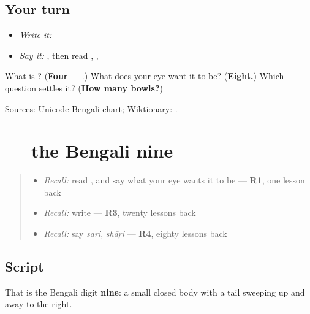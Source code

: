 \subsection*{Your turn}
\begin{itemize}
\raggedright
  \item \emph{Write it:} 
  \item \emph{Say it:} \textbf{}, then read \textbf{}, \textbf{}, \textbf{}
\end{itemize}

\begin{tcolorbox}[breakable,colback=teal!4,colframe=teal!35!black,title={Before you move on}]
What is \textbf{}? (\textbf{Four} — \textbf{}.) What does your eye want it to be? (\textbf{Eight.}) Which question settles it? (\textbf{How many bowls?})

Sources: \href{https://www.unicode.org/charts/PDF/U0980.pdf}{Unicode Bengali chart}; \href{https://en.wiktionary.org/wiki/\%E0\%A7\%AA}{Wiktionary: }.
\end{tcolorbox}
\section[\texorpdfstring{\bn{৯} (digit nine)}{৯ (digit nine)}]{ — the Bengali nine}

\label{lesson:BN-W07-digit-nine}



\begin{quote}
\begin{itemize}
\raggedright
  \item \emph{Recall:} read \textbf{}, and say what your eye wants it to be — \textbf{R1}, one lesson back
  \item \emph{Recall:} write \textbf{} — \textbf{R3}, twenty lessons back
  \item \emph{Recall:} say \emph{sari}, \emph{shāṛi} — \textbf{R4}, eighty lessons back
\end{itemize}
\end{quote}

\subsection*{Script}
\begin{quote}
\end{quote}

That is the Bengali digit \textbf{nine}: a small closed body with a tail sweeping up and away to the right.

